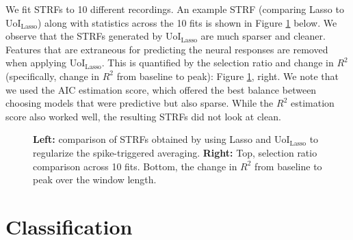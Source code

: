 \documentclass[11pt]{article}
\begin{document}
We fit STRFs to 10 different recordings. An example STRF (comparing Lasso to UoI$_{\text{Lasso}}$)  along with statistics across the 10 fits is shown in Figure \ref{fig:strfs} below. We observe that the STRFs generated by UoI$_{\text{Lasso}}$ are much sparser and cleaner. Features that are extraneous for predicting the neural responses are removed when applying UoI$_{\text{Lasso}}$. This is quantified by the selection ratio and change in $R^2$ (specifically, change in $R^2$ from baseline to peak):  Figure \ref{fig:strfs}, right. We note that we used the AIC estimation score, which offered the best balance between choosing models that were predictive but also sparse. While the $R^2$ estimation score also worked well, the resulting STRFs did not look at clean.

\begin{figure}[h!]
	\centering
	
	\caption{\textbf{Left:} comparison of STRFs obtained by using Lasso and UoI$_{\text{Lasso}}$ to regularize the spike-triggered averaging. \textbf{Right:} Top, selection ratio comparison across 10 fits. Bottom, the change in $R^2$ from baseline to peak over the window length.}
	\label{fig:strfs}
\end{figure}

\newpage 
\section{Classification}
\end{document}
